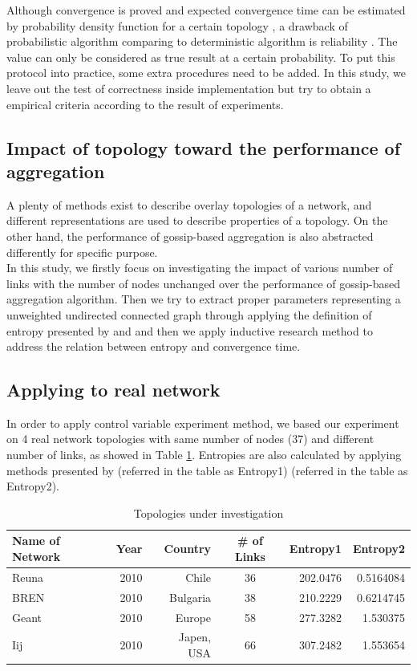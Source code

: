 Although convergence is proved and expected convergence time can be estimated by probability density function for a certain topology \cite{5929538}, a drawback of probabilistic algorithm comparing to deterministic algorithm is reliability \cite{Lynch:1996:DA:525656}. The value can only be considered as true result at a certain probability. To put this protocol into practice, some extra procedures need to be added. In this study, we leave out the test of correctness inside implementation but try to obtain a empirical criteria according to the result of experiments.\\

\subsection{Impact of topology toward the performance of aggregation}
A plenty of methods exist to describe overlay topologies of a network, and different representations are used to describe properties of a topology. On the other hand, the performance of gossip-based aggregation is also abstracted differently for specific purpose.\\
In this study, we firstly focus on investigating the impact of various number of links with the number of nodes unchanged over the performance of gossip-based aggregation algorithm. Then we try to extract proper parameters representing a unweighted undirected connected graph through applying the definition of entropy presented by \cite{entropy1} and \cite{entropy2} and then we apply inductive research method \cite{portal} to address the relation between entropy and convergence time.

\subsection{Applying to real network}
In order to apply control variable experiment method, we based our experiment on 4 real network topologies with same number of nodes (37) and different number of links, as showed in Table \ref{table: network}. Entropies are also calculated by applying methods presented by \cite{entropy1} (referred in the table as Entropy1) \cite{entropy2} (referred in the table as Entropy2).

\begin{table}
\centering
\begin{tabular}{lrrcrr}
	\hline
	Name of Network & Year & Country & \# of Links & Entropy1 & Entropy2\\
    \hline
    Reuna & 2010 & Chile & 36 & 202.0476 & 0.5164084\\
    BREN & 2010 & Bulgaria & 38 & 210.2229 & 0.6214745\\
    Geant & 2010 & Europe & 58 & 277.3282 & 1.530375\\
    Iij & 2010 & Japen, USA & 66 & 307.2482 & 1.553654\\
    \hline
\end{tabular}
\caption{Topologies under investigation}
\label{table: network}
\end{table}

